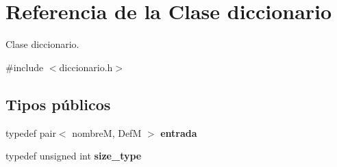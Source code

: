 \hypertarget{classdiccionario}{\section{\-Referencia de la \-Clase diccionario}
\label{classdiccionario}
}


\-Clase diccionario.  




{\ttfamily \#include $<$diccionario.\-h$>$}

\subsection*{\-Tipos públicos}
\begin{DoxyCompactItemize}
\item 
\hypertarget{classdiccionario_a047662bbdafafb7a898cedb371bfcb33}{typedef pair$<$ nombre\-M, \-Def\-M $>$ {\bfseries entrada}}\label{classdiccionario_a047662bbdafafb7a898cedb371bfcb33}

\item 
\hypertarget{classdiccionario_aa5ebee53d922cfd46db90f11cac6da35}{typedef unsigned int {\bfseries size\-\_\-type}}\label{classdiccionario_aa5ebee53d922cfd46db90f11cac6da35}

\end{DoxyCompactItemize}
